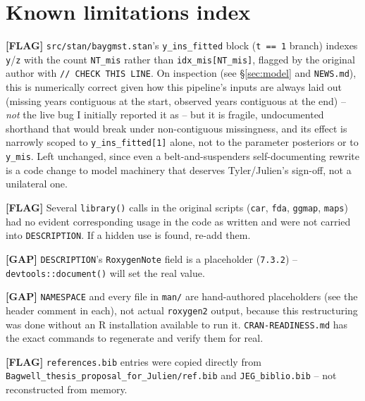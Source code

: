\documentclass[10pt]{article}
\newcommand{\gap}[1]{\textcolor{gapred}{\textbf{[GAP]} #1}}
\newcommand{\flag}[1]{\textcolor{gaporange}{\textbf{[FLAG]} #1}}
\begin{document}
\section*{Known limitations index}
\flag{\texttt{src/stan/baygmst.stan}'s \texttt{y\_ins\_fitted} block
(\texttt{t == 1} branch) indexes \texttt{y}/\texttt{z} with the count
\texttt{NT\_mis} rather than \texttt{idx\_mis[NT\_mis]}, flagged by the
original author with \texttt{// CHECK THIS LINE}. On inspection (see
\S\ref{sec:model} and \texttt{NEWS.md}), this is numerically correct given
how this pipeline's inputs are always laid out (missing years contiguous at
the start, observed years contiguous at the end) -- \emph{not} the live bug
I initially reported it as -- but it is fragile, undocumented shorthand
that would break under non-contiguous missingness, and its effect is
narrowly scoped to \texttt{y\_ins\_fitted[1]} alone, not to the parameter
posteriors or to \texttt{y\_mis}. Left unchanged, since even a
belt-and-suspenders self-documenting rewrite is a code change to model
machinery that deserves Tyler/Julien's sign-off, not a unilateral one.}

\flag{Several \texttt{library()} calls in the original scripts
(\texttt{car}, \texttt{fda}, \texttt{ggmap}, \texttt{maps}) had no evident
corresponding usage in the code as written and were not carried into
\texttt{DESCRIPTION}. If a hidden use is found, re-add them.}

\gap{\texttt{DESCRIPTION}'s \texttt{RoxygenNote} field is a placeholder
(\texttt{7.3.2}) -- \texttt{devtools::document()} will set the real value.}

\gap{\texttt{NAMESPACE} and every file in \texttt{man/} are hand-authored
placeholders (see the header comment in each), not actual
\texttt{roxygen2} output, because this restructuring was done without an R
installation available to run it. \texttt{CRAN-READINESS.md} has the exact
commands to regenerate and verify them for real.}

\clearpage
\flag{\texttt{references.bib} entries were copied directly from
\texttt{Bagwell\_thesis\_proposal\_for\_Julien/ref.bib} and
\texttt{JEG\_biblio.bib} -- not reconstructed from memory.}


\end{document}
